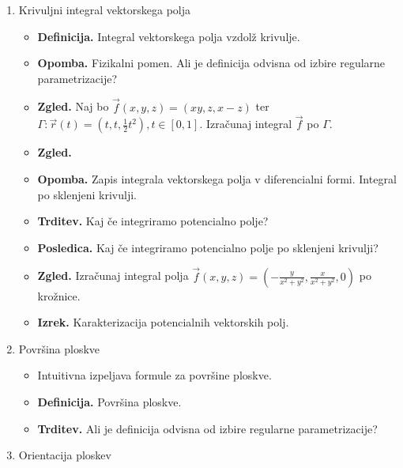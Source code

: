 \begin{enumerate}
    \item Krivuljni integral vektorskega polja
    \begin{itemize}
        \item \textbf{Definicija.} Integral vektorskega polja vzdolž krivulje.
        \item \textbf{Opomba.} Fizikalni pomen. Ali je definicija odvisna od izbire regularne parametrizacije?
        \item \textbf{Zgled.} Naj bo \(\vec{f}(x,y,z) = (xy, z, x- z)\) ter \(\Gamma: \vec{r}(t) = (t, t, \frac{1}{2}t^2), t \in [0,1]\). Izračunaj integral \(\vec{f}\) po \(\Gamma\).
        \item \textbf{Zgled.} 
        \item \textbf{Opomba.} Zapis integrala vektorskega polja v diferencialni formi. Integral po sklenjeni krivulji. 
        \item \textbf{Trditev.} Kaj če integriramo potencialno polje?
        \item \textbf{Posledica.} Kaj če integriramo potencialno polje po sklenjeni krivulji?
        \item \textbf{Zgled.} Izračunaj integral polja \(\vec{f}(x,y,z) = \left(-\frac{y}{x^2 + y^2}, \frac{x}{x^2+y^2}, 0\right)\) po krožnice.
        \item \textbf{Izrek.} Karakterizacija potencialnih vektorskih polj.
    \end{itemize}

    \item Površina ploskve
    \begin{itemize}
        \item Intuitivna izpeljava formule za površine ploskve.
        \item \textbf{Definicija.} Površina ploskve.
        \item \textbf{Trditev.} Ali je definicija odvisna od izbire regularne parametrizacije?
    \end{itemize}

    \item Orientacija ploskev
    

\end{enumerate}
